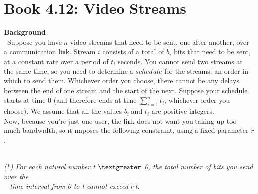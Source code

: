 \documentclass[12pt]{article}
\begin{document}

\newcommand{\hmwkClass}{COS 255}
\newcommand{\hmwkSemester}{Spring 2016}

\newcommand{\hmwkAuthorName}{Lukas Leung}
\newcommand{\hmwkAuthorID}{lleung}

\newcommand{\hmwkAssignmentNum}{4}

\newcommand{\hmwkProblemNum}{12}

\newcommand{\hmwkCollaborators}{}
\thispagestyle{fancycollab}


\section{Book 4.12: Video Streams}
\textbf{Background} \\
~\indent Suppose you have $n$ video streams that need to be sent,
one after another, over a communication link. Stream $i$ consists
of a total of $b_i$ bits that need to be sent, at a constant rate
over a period of $t_i$ seconds. You cannot send two streams at the
same time, so you need to determine a $schedule$ for the streams:
an order in which to send them. Whichever order you choose, there
cannot be any delays between the end of one stream and the start
of the next. Suppose your schedule starts at time 0 (and therefore
ends at time $\sum_{i=1}^{n} t_i$, whichever order you choose). We
assume that all the values $b_i$ and $t_i$ are positive integers. \\
\indent Now, because you're just one user, the link does not want
you taking up too much bandwidth, so it imposes the following
constraint, using a fixed parameter $r$.

~ \\ \indent \textit{($\ast$) For each natural number t
$\textgreater$ 0, the total number of bits you send over the \\
~ \indent time interval from 0 to t cannot exceed r$\cdot$t.} \\
\end{document}
